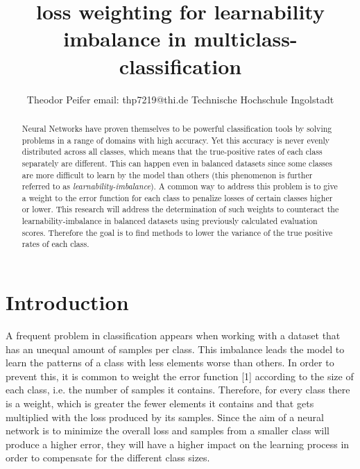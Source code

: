\documentclass[journal]{IEEEtran}
\begin{document}
\title{\textbf{loss weighting for learnability imbalance in multiclass-classification}}



\author{Theodor Peifer
        \linebreak
        email: thp7219@thi.de
        \linebreak
        Technische Hochschule Ingolstadt
}



\maketitle


\begin{abstract}
Neural Networks have proven themselves to be powerful classification
tools by solving problems in a range of domains with high accuracy.
Yet this accuracy is never evenly distributed across all classes, which means that the true-positive rates of each class separately are different.
This can happen even in balanced datasets since some classes are more difficult to learn by the model than others (this phenomenon is further referred to as \emph{learnability-imbalance}).
A common way to address this problem is to give a weight to the error function for each class to penalize losses of certain classes higher or lower.
This research will address the determination of such weights to counteract the learnability-imbalance in balanced datasets using previously calculated evaluation scores.
Therefore the goal is to find methods to lower the variance of the true positive rates of each class.
\end{abstract}


\section{Introduction}
A frequent problem in classification appears when working with a dataset that has an unequal amount of samples per class.
This imbalance leads the model to learn the patterns of a class with less elements worse than others.
In order to prevent this, it is common to weight the error function [1] according to the size of each class, i.e. the number of samples it contains.
Therefore, for every class there is a weight, which is greater the fewer elements it contains and that gets multiplied with the loss produced by its samples. %
Since the aim of a neural network is to minimize the overall loss and samples from a smaller class will produce a higher error, they will have a higher impact on the learning process in order to compensate for the different class sizes.
\end{document}
